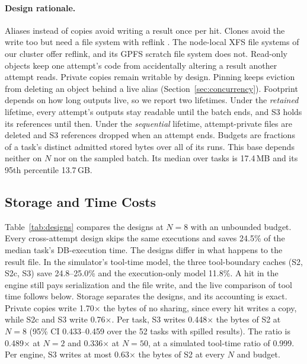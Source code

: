 \paragraph{Design rationale.}
Aliases instead of copies avoid writing a result once per hit. Clones avoid the write too but need a file system with reflink \cite{mkfsxfs2026}. The node-local XFS file systems of our cluster offer reflink, and its GPFS scratch file system does not. Read-only objects keep one attempt's code from accidentally altering a result another attempt reads. Private copies remain writable by design. Pinning keeps eviction from deleting an object behind a
live alias (Section~\ref{sec:concurrency}). Footprint depends on how long outputs live, so we report two lifetimes.
Under the \emph{retained} lifetime, every attempt's outputs stay readable until the batch ends, and S3 holds its
references until then. Under the \emph{sequential} lifetime, attempt-private files are deleted and S3 references
dropped when an attempt ends. Budgets are fractions of a task's distinct admitted stored bytes over all of its runs.
This base depends neither on $N$ nor on the sampled batch. Its median over tasks is 17.4\,MB and its 95th percentile
13.7\,GB.



\subsection{Storage and Time Costs}
\label{sec:storage}

Table~\ref{tab:designs} compares the designs at $N=8$ with an unbounded budget. Every cross-attempt design skips the
same executions and saves 24.5\% of the median task's DB-execution time. The designs differ in what happens to the
result file. In the simulator's tool-time model, the three tool-boundary caches (S2, S2c, S3) save 24.8--25.0\% and
the execution-only model 11.8\%. A hit in the engine still pays serialization and the file write, and the live
comparison of tool time follows below. Storage separates the designs, and its accounting is exact. Private copies
write 1.70$\times$ the bytes of no sharing, since every hit writes a copy, while S2c and S3 write 0.76$\times$. Per
task, S3 writes 0.448$\times$ the bytes of S2 at $N=8$ (95\% CI 0.433--0.459 over the 52 tasks with spilled results).
The ratio is 0.489$\times$ at $N=2$ and 0.336$\times$ at $N=50$, at a simulated tool-time ratio of 0.999. Per engine,
S3 writes at most 0.63$\times$ the bytes of S2 at every $N$ and budget.

